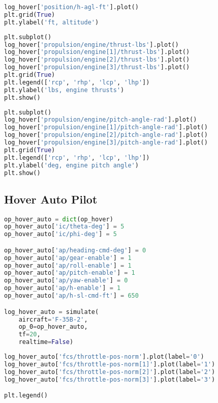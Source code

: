 \begin{lstlisting}[language=Python]
log_hover['position/h-agl-ft'].plot()
plt.grid(True)
plt.ylabel('ft, altitude')
\end{lstlisting}

\begin{lstlisting}[language=Python]
plt.subplot()
log_hover['propulsion/engine/thrust-lbs'].plot()
log_hover['propulsion/engine[1]/thrust-lbs'].plot()
log_hover['propulsion/engine[2]/thrust-lbs'].plot()
log_hover['propulsion/engine[3]/thrust-lbs'].plot()
plt.grid(True)
plt.legend(['rcp', 'rhp', 'lcp', 'lhp'])
plt.ylabel('lbs, engine thrusts')
plt.show()
\end{lstlisting}

\begin{lstlisting}[language=Python]
plt.subplot()
log_hover['propulsion/engine/pitch-angle-rad'].plot()
log_hover['propulsion/engine[1]/pitch-angle-rad'].plot()
log_hover['propulsion/engine[2]/pitch-angle-rad'].plot()
log_hover['propulsion/engine[3]/pitch-angle-rad'].plot()
plt.grid(True)
plt.legend(['rcp', 'rhp', 'lcp', 'lhp'])
plt.ylabel('deg, engine pitch angle')
plt.show()
\end{lstlisting}

\hypertarget{hover-auto-pilot}{%
\subsection{Hover Auto Pilot}\label{hover-auto-pilot}}

\begin{lstlisting}[language=Python]
op_hover_auto = dict(op_hover)
op_hover_auto['ic/theta-deg'] = 5
op_hover_auto['ic/phi-deg'] = 5

op_hover_auto['ap/heading-cmd-deg'] = 0
op_hover_auto['ap/gear-enable'] = 1
op_hover_auto['ap/roll-enable'] = 1
op_hover_auto['ap/pitch-enable'] = 1
op_hover_auto['ap/yaw-enable'] = 0
op_hover_auto['ap/h-enable'] = 1
op_hover_auto['ap/h-sl-cmd-ft'] = 650

log_hover_auto = simulate(
    aircraft='F-35B-2',
    op_0=op_hover_auto,
    tf=20,
    realtime=False)
\end{lstlisting}

\begin{lstlisting}[language=Python]
log_hover_auto['fcs/throttle-pos-norm'].plot(label='0')
log_hover_auto['fcs/throttle-pos-norm[1]'].plot(label='1')
log_hover_auto['fcs/throttle-pos-norm[2]'].plot(label='2')
log_hover_auto['fcs/throttle-pos-norm[3]'].plot(label='3')

plt.legend()
\end{lstlisting}

